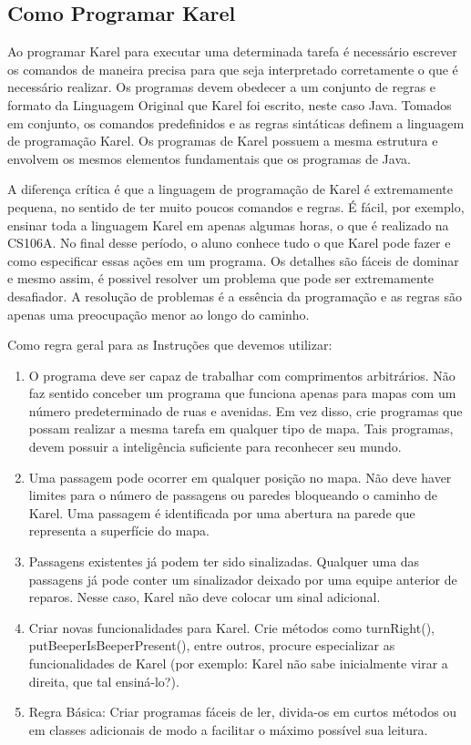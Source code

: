 \documentclass[a4paper,11pt]{article}
\begin{document}
\subsection{Como Programar Karel}
Ao programar Karel para executar uma determinada tarefa é necessário escrever os comandos de maneira precisa para que seja interpretado corretamente o que é necessário realizar. Os programas devem obedecer a um conjunto de regras e formato da Linguagem Original que Karel foi escrito, neste caso Java. Tomados em conjunto, os comandos predefinidos e as regras sintáticas definem a linguagem de programação Karel. Os programas de Karel possuem a mesma estrutura e envolvem os mesmos elementos fundamentais que os programas de Java. 

A diferença crítica é que a linguagem de programação de Karel é extremamente pequena, no sentido de ter muito poucos comandos e regras. É fácil, por exemplo, ensinar toda a linguagem Karel em apenas algumas horas, o que é realizado na CS106A. No final desse período, o aluno conhece tudo o que Karel pode fazer e como especificar essas ações em um programa. Os detalhes são fáceis de dominar e mesmo assim, é possivel resolver um problema que pode ser extremamente desafiador. A resolução de problemas é a essência da programação e as regras são apenas uma preocupação menor ao longo do caminho.

Como regra geral para as Instruções que devemos utilizar: \vspace{-1em}
\begin{enumerate}
  \item O programa deve ser capaz de trabalhar com comprimentos arbitrários. Não faz sentido conceber um programa que funciona apenas para mapas com um número predeterminado de ruas e avenidas. Em vez disso, crie programas que possam realizar a mesma tarefa em qualquer tipo de mapa. Tais programas, devem possuir a inteligência suficiente para reconhecer seu mundo.
  \item Uma passagem pode ocorrer em qualquer posição no mapa. Não deve haver limites para o número de passagens ou paredes bloqueando o caminho de Karel. Uma passagem é identificada por uma abertura na parede que representa a superfície do mapa.
  \item Passagens existentes já podem ter sido sinalizadas. Qualquer uma das passagens já pode conter um sinalizador deixado por uma equipe anterior de reparos. Nesse caso, Karel não deve colocar um sinal adicional.
  \item Criar novas funcionalidades para Karel. Crie métodos como turnRight(), putBeeperIsBeeperPresent(), entre outros, procure especializar as funcionalidades de Karel (por exemplo: Karel não sabe inicialmente virar a direita, que tal ensiná-lo?). 
  \item Regra Básica: Criar programas fáceis de ler, divida-os em curtos métodos ou em classes adicionais de modo a facilitar o máximo possível sua leitura.
\end{enumerate}
\end{document}
